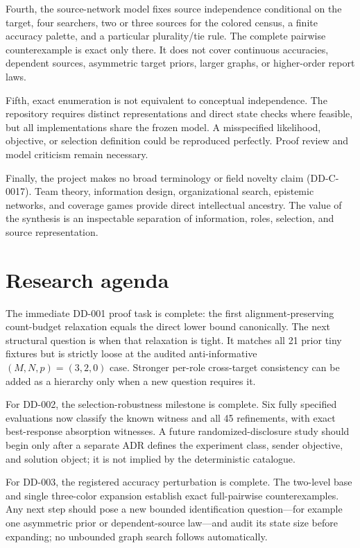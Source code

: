 \documentclass[11pt]{article}
\theoremstyle{remark}
\begin{document}
Fourth, the source-network model fixes source independence conditional on the
target, four searchers, two or three sources for the colored census, a finite
accuracy palette, and a particular plurality/tie rule. The complete pairwise
counterexample is exact only there. It does not cover continuous accuracies,
dependent sources, asymmetric target priors, larger graphs, or higher-order report
laws.

Fifth, exact enumeration is not equivalent to conceptual independence. The
repository requires distinct representations and direct state checks where
feasible, but all implementations share the frozen model. A misspecified
likelihood, objective, or selection definition could be reproduced perfectly.
Proof review and model criticism remain necessary.

Finally, the project makes no broad terminology or field novelty claim
(DD-C-0017). Team theory, information design, organizational search, epistemic
networks, and coverage games provide direct intellectual ancestry. The value of
the synthesis is an inspectable separation of information, roles, selection, and
source representation.

\section{Research agenda}
The immediate DD-001 proof task is complete: the first alignment-preserving
count-budget relaxation equals the direct lower bound canonically. The next
structural question is when that relaxation is tight. It matches all 21 prior tiny
fixtures but is strictly loose at the audited anti-informative
$(M,N,p)=(3,2,0)$ case. Stronger per-role cross-target consistency can be added as
a hierarchy only when a new question requires it.

For DD-002, the selection-robustness milestone is complete. Six fully specified
evaluations now classify the known witness and all 45 refinements, with exact
best-response absorption witnesses. A future randomized-disclosure study should
begin only after a separate ADR defines the experiment class, sender objective,
and solution object; it is not implied by the deterministic catalogue.

For DD-003, the registered accuracy perturbation is complete. The two-level base
and single three-color expansion establish exact full-pairwise counterexamples.
Any next step should pose a new bounded identification question---for example one
asymmetric prior or dependent-source law---and audit its state size before
expanding; no unbounded graph search follows automatically.
\end{document}
